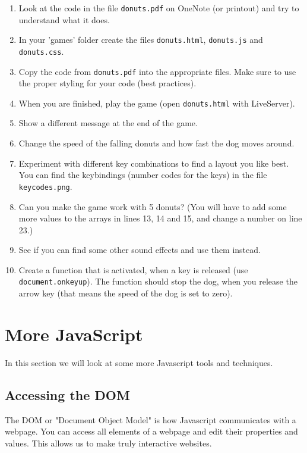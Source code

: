 \documentclass[11pt,a4paper]{report}
\begin{document}
\begin{ex}
\begin{enumerate}
\item Look at the code in the file \verb|donuts.pdf| on OneNote (or printout) and try to understand what it does.
\item In your 'games' folder create the files \verb|donuts.html|, \verb|donuts.js| and \verb|donuts.css|.
\item Copy the code from \verb|donuts.pdf| into the appropriate files. Make sure to use  the proper styling for your code (best practices). 
\item When you are finished, play the game (open \verb|donuts.html| with LiveServer).
\item Show a different message at the end of the game.
\item Change the speed of the falling donuts and how fast the dog moves around.
\item Experiment with different key combinations to find a layout you like best. You can find the keybindings (number codes for the keys) in the file \verb|keycodes.png|.
\item Can you make the game work with 5 donuts? (You will have to add some more values to the arrays in lines 13, 14 and 15, and change a number on line 23.)
\item See if you can find some other sound effects and use them instead.
\item Create a function that is activated, when a key is released (use \verb|document.onkeyup|).  The function should stop the dog, when you release the arrow key (that means the speed of the dog is set to zero).
\end{enumerate}
\end{ex}


\newpage

\section{More JavaScript}
In this section we will look at some more Javascript tools and techniques.

\subsection{Accessing the DOM}

The DOM or "Document Object Model" is how Javascript communicates with a webpage.  You can access all elements of a webpage and edit their properties and values. This allows us to make truly interactive websites.
\end{document}
